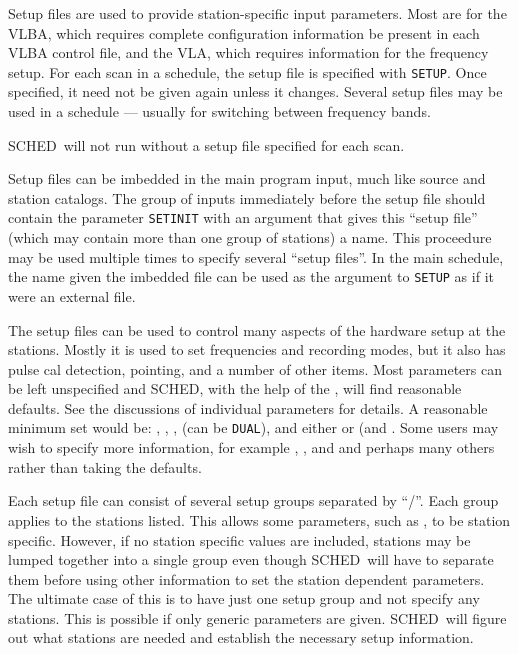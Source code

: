 \documentclass{report}
\newcommand{\sched}{{\sc SCHED}}
\newcommand{\schedb}{{\sc SCHED~}}
\begin{document}
Setup files are used to provide station-specific input parameters.
Most are for the VLBA, which requires complete configuration
information be present in each VLBA control file, and the VLA, which
requires information for the frequency setup.  For each scan in a
schedule, the setup file is specified with {\tt SETUP}.  Once specified,
it need not be given again unless it changes.  Several setup files
may be used in a schedule --- usually for switching between frequency
bands.

\schedb will not run without a setup file specified for each
scan.

Setup files can be imbedded in the main program input, much like
source and station catalogs.  The group of inputs immediately before
the setup file should contain the parameter {\tt SETINIT} with an
argument that gives this ``setup file'' (which may contain more than
one group of stations) a name.  This proceedure may be used multiple
times to specify several ``setup files''.  In the main schedule,
the name given the imbedded file can be used as the argument to
{\tt SETUP} as if it were an external file.

The setup files can be used to control many aspects of the hardware
setup at the stations.  Mostly it is used to set frequencies and
recording modes, but it also has pulse cal detection, pointing, and a
number of other items.  Most parameters can be left unspecified and
\sched, with the help of the ,
will find reasonable defaults.  See the discussions of individual
parameters for details. A reasonable minimum set would be:
, , ,  (can be {\tt DUAL}), and either  or  (and
.  Some users may wish to specify
more information, for example ,
, and  and perhaps many others rather than taking the
defaults.

Each setup file can consist of several setup groups separated by ``/''.
Each group applies to the stations listed.  This allows some parameters,
such as , to be station specific.
However, if no station specific values are included, stations may be
lumped together into a single group even though \schedb will have
to separate them before using other information to set the station
dependent parameters.  The ultimate case of this is to have just
one setup group and not specify any stations.  This is possible if
only generic parameters are given.  \schedb will figure out what
stations are needed and establish the necessary setup information.
\end{document}
